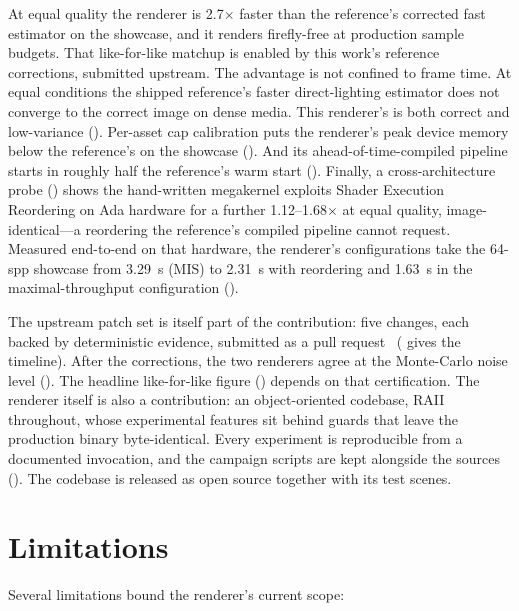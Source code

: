 At equal
quality the renderer is \num{2.7}$\times$ faster than the reference's corrected fast estimator on the
showcase, and it renders firefly-free at production sample budgets. That like-for-like matchup is
enabled by this work's reference corrections, submitted upstream. The advantage is not confined to
frame time. At equal conditions the shipped reference's faster direct-lighting estimator does not
converge to the correct image on dense media. This renderer's is both correct and low-variance
(). Per-asset cap calibration puts the renderer's peak
device memory below the reference's on the showcase (). And its
ahead-of-time-compiled pipeline starts in roughly half the reference's warm start
(). Finally, a cross-architecture probe () shows the
hand-written megakernel exploits Shader Execution Reordering on Ada hardware for a further
\num{1.12}--\num{1.68}$\times$ at equal quality, image-identical---a reordering the reference's compiled pipeline cannot request. Measured end-to-end on that hardware, the renderer's
configurations take the \num{64}-spp showcase
from \SI{3.29}{\second} (MIS) to \SI{2.31}{\second} with reordering and \SI{1.63}{\second} in the
maximal-throughput configuration ().

The upstream patch set is itself part of the contribution: five changes, each backed by
deterministic evidence, submitted as a pull request~\cite{KramarzVolprimFixes2026}
( gives the timeline). After the corrections, the two renderers agree
at the Monte-Carlo noise level (). The headline like-for-like figure () depends on that certification.
The renderer itself is also a contribution: an object-oriented codebase, RAII
throughout, whose experimental features sit behind guards that leave the production
binary byte-identical. Every experiment is reproducible from a documented invocation, and the
campaign scripts are kept alongside the sources (). The codebase is released as
open source together with its test scenes.

\section{Limitations}
\label{sec:limitations}

Several limitations bound the renderer's current scope:

